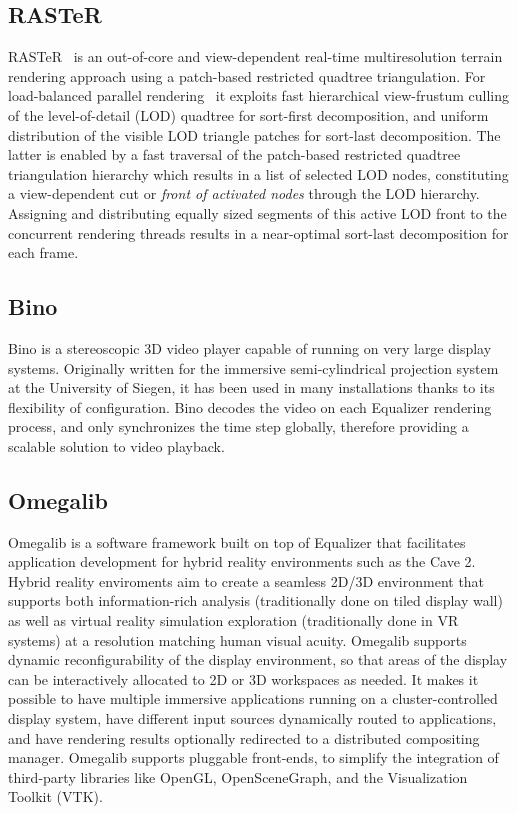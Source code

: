 \documentclass[10pt,journal,compsoc]{IEEEtran}
\begin{document}
\subsection{RASTeR}

RASTeR~\cite{BGP:09} is an out-of-core and view-dependent real-time multiresolution
terrain rendering approach using a patch-based restricted quadtree triangulation.
For load-balanced parallel rendering~\cite{GMBP:10} it exploits fast hierarchical
view-frustum culling of the level-of-detail (LOD) quadtree for sort-first decomposition, and
uniform distribution of the visible LOD triangle patches for sort-last decomposition.
The latter is enabled by a fast traversal of the patch-based restricted quadtree
triangulation hierarchy which results in a list of selected LOD nodes,
constituting a view-dependent cut or \emph{front of activated nodes} through the LOD hierarchy.
Assigning and distributing equally sized segments of this active LOD front to the concurrent
rendering threads results in a near-optimal sort-last decomposition for each frame.

\subsection{Bino}

Bino is a stereoscopic 3D video player capable of running on very large display
systems. Originally written for the immersive semi-cylindrical projection
system at the University of Siegen, it has been used in many installations
thanks to its flexibility of configuration. Bino decodes the video on each
Equalizer rendering process, and only synchronizes the time step globally,
therefore providing a scalable solution to video playback.

\subsection{Omegalib}

Omegalib \cite{Omegalib} is a software framework built on top of Equalizer that
facilitates application development for hybrid reality environments such as the
Cave 2. Hybrid reality enviroments aim to create a seamless 2D/3D environment
that supports both information-rich analysis (traditionally done on tiled
display wall) as well as virtual reality simulation exploration (traditionally
done in VR systems) at a resolution matching human visual acuity. Omegalib
supports dynamic reconfigurability of the display environment, so that areas of
the display can be interactively allocated to 2D or 3D workspaces as needed. It
makes it possible to have multiple immersive applications running on a
cluster-controlled display system, have different input sources dynamically
routed to applications, and have rendering results optionally redirected to a
distributed compositing manager. Omegalib supports pluggable front-ends, to
simplify the integration of third-party libraries like OpenGL, OpenSceneGraph,
and the Visualization Toolkit (VTK).
\end{document}
